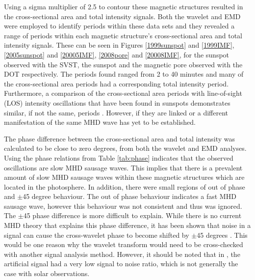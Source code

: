     Using a sigma multiplier of 2.5 to contour these magnetic structures resulted in the cross-sectional area and total intensity signals.
    Both the wavelet and EMD were employed to identify periods within these data sets and they revealed a range of periods within each magnetic structure's cross-sectional area and total intensity signals.
    These can be seen in Figures \ref{1999sunspot} and \ref{1999IMF}, \ref{2005sunspot} and \ref{20005IMF}, \ref{2008pore} and \ref{20008IMF}, for the sunspot observed with the SVST, the sunspot and the magnetic pore observed with the DOT respectively.
    The periods found ranged from 2 to 40 minutes and many of the cross-sectional area periods had a corresponding total intensity period.
    Furthermore, a comparison of the cross-sectional area periods with line-of-sight (LOS) intensity oscillations that have been found in sunspots demonstrates similar, if not the same, periods \citep{kobanov}.
    However, if they are linked or a different manifestation of the same MHD wave has yet to be established.
   
    The phase difference between the cross-sectional area and total intensity was calculated to be close to zero degrees, from both the wavelet and EMD analyses.
    Using the phase relations from Table \ref{tab:phase} indicates that the observed oscillations are slow MHD sausage waves. 
    This implies that there is a prevalent amount of slow MHD sausage waves within these magnetic structures which are located in the photosphere.
    In addition, there were small regions of out of phase and $\pm$45 degree behaviour.
    The out of phase behaviour indicates a fast MHD sausage wave, however this behaviour was not consistent and thus was ignored. 
    The $\pm$45 phase difference is more difficult to explain.
    While there is no current MHD theory that explains this phase difference, it has been shown that noise in a signal can cause the cross-wavelet phase to become shifted by $\pm$45 degrees \citep{2015A&A...579A..73M}.
    This would be one reason why the wavelet transform would need to be cross-checked with another signal analysis method.
    However, it should be noted that in \cite{2015A&A...579A..73M}, the artificial signal had a very low signal to noise ratio, which is not generally the case with solar observations. 
    
